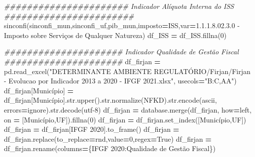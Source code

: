 \documentclass[
  12,
  dvipsnames]{article}
\newenvironment{Shaded}{\begin{snugshade}}{\end{snugshade}}
\newcommand{\BuiltInTok}[1]{#1}
\newcommand{\CommentTok}[1]{\textcolor[rgb]{0.56,0.35,0.01}{\textit{#1}}}
\newcommand{\DecValTok}[1]{\textcolor[rgb]{0.00,0.00,0.81}{#1}}
\newcommand{\NormalTok}[1]{#1}
\newcommand{\OperatorTok}[1]{\textcolor[rgb]{0.81,0.36,0.00}{\textbf{#1}}}
\newcommand{\StringTok}[1]{\textcolor[rgb]{0.31,0.60,0.02}{#1}}
\newcommand{\VariableTok}[1]{\textcolor[rgb]{0.00,0.00,0.00}{#1}}
\newcommand{\VerbatimStringTok}[1]{\textcolor[rgb]{0.31,0.60,0.02}{#1}}
\begin{document}
\begin{Shaded}
\begin{Highlighting}[]
\CommentTok{\#\#\#\#\#\#\#\#\#\#\#\#\#\#\#\#\#\#\#\#\#\# Indicador Alíquota Interna do ISS \#\#\#\#\#\#\#\#\#\#\#\#\#\#\#\#\#\#\#\#\#\#\#}
\NormalTok{sinconfi(sinconfi\_mun,sinconfi\_uf,pib\_mun,imposto}\OperatorTok{=}\StringTok{\textquotesingle{}ISS\textquotesingle{}}\NormalTok{,var}\OperatorTok{=}\StringTok{\textquotesingle{}1.1.1.8.02.3.0 {-} Imposto sobre Serviços de Qualquer Natureza\textquotesingle{}}\NormalTok{)}
\NormalTok{df\_ISS }\OperatorTok{=}\NormalTok{ df\_ISS.fillna(}\DecValTok{0}\NormalTok{)}

\CommentTok{\#\#\#\#\#\#\#\#\#\#\#\#\#\#\#\#\#\#\#\#\# Indicador Qualidade de Gestão Fiscal \#\#\#\#\#\#\#\#\#\#\#\#\#\#\#\#\#\#\#\#\#}
\NormalTok{df\_firjan }\OperatorTok{=}\NormalTok{ pd.read\_excel(}\StringTok{"DETERMINANTE AMBIENTE REGULATÓRIO/Firjan/Firjan {-} Evolucao por Indicador 2013 a 2020 {-} IFGF 2021.xlsx"}\NormalTok{, usecols}\OperatorTok{=}\StringTok{"B:C,AA"}\NormalTok{)}
\NormalTok{df\_firjan[}\StringTok{\textquotesingle{}Município\textquotesingle{}}\NormalTok{] }\OperatorTok{=}\NormalTok{ df\_firjan[}\StringTok{\textquotesingle{}Município\textquotesingle{}}\NormalTok{].}\BuiltInTok{str}\NormalTok{.upper().}\BuiltInTok{str}\NormalTok{.normalize(}\StringTok{\textquotesingle{}NFKD\textquotesingle{}}\NormalTok{).}\BuiltInTok{str}\NormalTok{.encode(}\StringTok{\textquotesingle{}ascii\textquotesingle{}}\NormalTok{, errors}\OperatorTok{=}\StringTok{\textquotesingle{}ignore\textquotesingle{}}\NormalTok{).}\BuiltInTok{str}\NormalTok{.decode(}\StringTok{\textquotesingle{}utf{-}8\textquotesingle{}}\NormalTok{)}
\NormalTok{df\_firjan }\OperatorTok{=}\NormalTok{ database.merge(df\_firjan, how}\OperatorTok{=}\StringTok{\textquotesingle{}left\textquotesingle{}}\NormalTok{, on }\OperatorTok{=}\NormalTok{ [}\StringTok{\textquotesingle{}Município\textquotesingle{}}\NormalTok{,}\StringTok{\textquotesingle{}UF\textquotesingle{}}\NormalTok{]).fillna(}\DecValTok{0}\NormalTok{)}
\NormalTok{df\_firjan }\OperatorTok{=}\NormalTok{ df\_firjan.set\_index([}\StringTok{\textquotesingle{}Município\textquotesingle{}}\NormalTok{,}\StringTok{\textquotesingle{}UF\textquotesingle{}}\NormalTok{])}
\NormalTok{df\_firjan }\OperatorTok{=}\NormalTok{ df\_firjan[}\StringTok{\textquotesingle{}IFGF 2020\textquotesingle{}}\NormalTok{].to\_frame()}
\NormalTok{df\_firjan }\OperatorTok{=}\NormalTok{ df\_firjan.replace(to\_replace}\OperatorTok{=}\VerbatimStringTok{r\textquotesingle{}nd\textquotesingle{}}\NormalTok{,value}\OperatorTok{=}\DecValTok{0}\NormalTok{,regex}\OperatorTok{=}\VariableTok{True}\NormalTok{)}
\NormalTok{df\_firjan }\OperatorTok{=}\NormalTok{ df\_firjan.rename(columns}\OperatorTok{=}\NormalTok{\{}\StringTok{\textquotesingle{}IFGF 2020\textquotesingle{}}\NormalTok{:}\StringTok{\textquotesingle{}Qualidade de Gestão Fiscal\textquotesingle{}}\NormalTok{\})}


\end{Highlighting}
\end{Shaded}
\end{document}
